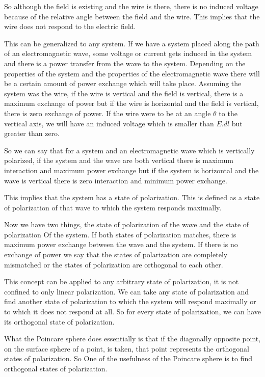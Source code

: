 So although the field is existing and the wire is there, there is no induced voltage because of the relative angle between the field and the wire. This implies that the wire does not respond to the electric field.

This can be generalized to any system. If we have a system placed along the path of an electromagnetic wave, some voltage or current gets induced in the system and there is a power transfer from the wave to the system. Depending on the properties of the system and the properties of the electromagnetic wave there will be a certain amount of power exchange which will take place. Assuming the system was the wire, if the wire is vertical and the field is vertical, there is a maximum exchange of power but if the wire is horizontal and the field is vertical, there is zero exchange of power. If the wire were to be at an angle $\theta$ to the vertical axis, we will have an induced voltage which is smaller than $\bar{E}$.$\bar{dl}$ but greater than zero.

So we can say that for a system and an electromagnetic wave which is vertically polarized, if the system and the wave are both vertical there is maximum interaction and maximum power exchange but if the system is horizontal and the wave is vertical there is zero interaction and minimum power exchange.

This implies that the system has a state of polarization. This is defined as a state of polarization of that wave to which the system responds maximally.

Now we have two things, the state of polarization of the wave and the state of polarization Of the system. If both states of polarization matches, there is maximum power exchange between the wave and the system. If there is no exchange of power we say that the states of polarization are completely mismatched or the states of polarization are orthogonal to each other.

This concept can be applied to any arbitrary state of polarization, it is not confined to only linear polarization. We can take any state of polarization and find another state of polarization to which the system will respond maximally or to which it does not respond at all. So for every state of polarization, we can have its orthogonal state of polarization. 

What the Poincare sphere does essentially is that if the diagonally opposite point, on the surface sphere of a point, is taken, that point represents the orthogonal states of polarization. So One of the usefulness of the Poincare sphere is to find orthogonal states of polarization.


